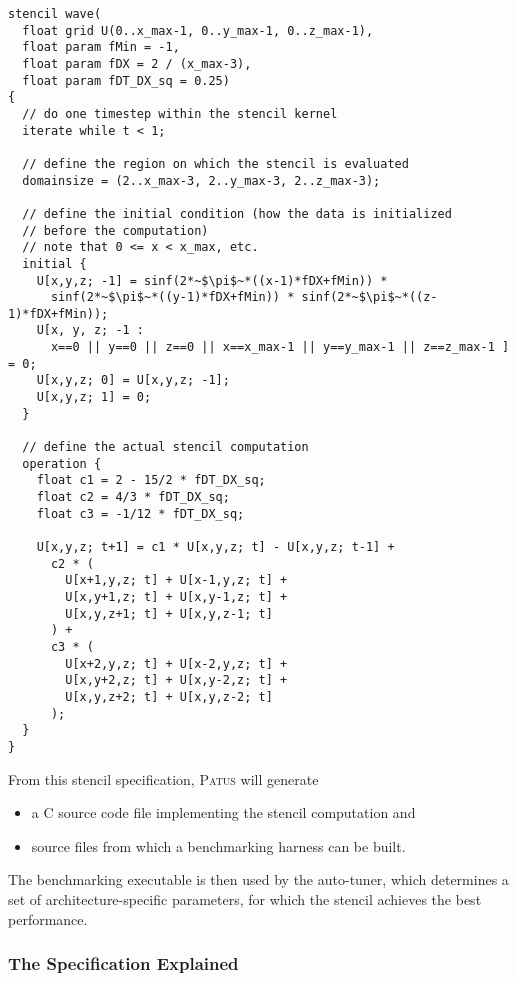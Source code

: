 \begin{lstlisting}[language=stencil]
stencil wave(
  float grid U(0..x_max-1, 0..y_max-1, 0..z_max-1), 
  float param fMin = -1,
  float param fDX = 2 / (x_max-3),
  float param fDT_DX_sq = 0.25)
{
  // do one timestep within the stencil kernel
  iterate while t < 1;
  
  // define the region on which the stencil is evaluated
  domainsize = (2..x_max-3, 2..y_max-3, 2..z_max-3);
  
  // define the initial condition (how the data is initialized
  // before the computation)
  // note that 0 <= x < x_max, etc.
  initial {
    U[x,y,z; -1] = sinf(2*~$\pi$~*((x-1)*fDX+fMin)) *
      sinf(2*~$\pi$~*((y-1)*fDX+fMin)) * sinf(2*~$\pi$~*((z-1)*fDX+fMin));
    U[x, y, z; -1 :
      x==0 || y==0 || z==0 || x==x_max-1 || y==y_max-1 || z==z_max-1 ] = 0;
    U[x,y,z; 0] = U[x,y,z; -1];
    U[x,y,z; 1] = 0;
  }

  // define the actual stencil computation
  operation {
    float c1 = 2 - 15/2 * fDT_DX_sq;
    float c2 = 4/3 * fDT_DX_sq;
    float c3 = -1/12 * fDT_DX_sq;
    
    U[x,y,z; t+1] = c1 * U[x,y,z; t] - U[x,y,z; t-1] +
      c2 * (
        U[x+1,y,z; t] + U[x-1,y,z; t] +
        U[x,y+1,z; t] + U[x,y-1,z; t] +
        U[x,y,z+1; t] + U[x,y,z-1; t]
      ) +
      c3 * (
        U[x+2,y,z; t] + U[x-2,y,z; t] +
        U[x,y+2,z; t] + U[x,y-2,z; t] +
        U[x,y,z+2; t] + U[x,y,z-2; t]
      );
  }
}
\end{lstlisting}

\noindent From this stencil specification, \textsc{Patus} will generate
\begin{itemize}
  \item a C source code file implementing the stencil computation and
  \item source files from which a benchmarking harness can be built.
\end{itemize}
The benchmarking executable is then used by the auto-tuner, which determines a set of
architecture-specific parameters, for which the stencil achieves the best performance.


\subsubsection{The Specification Explained}

